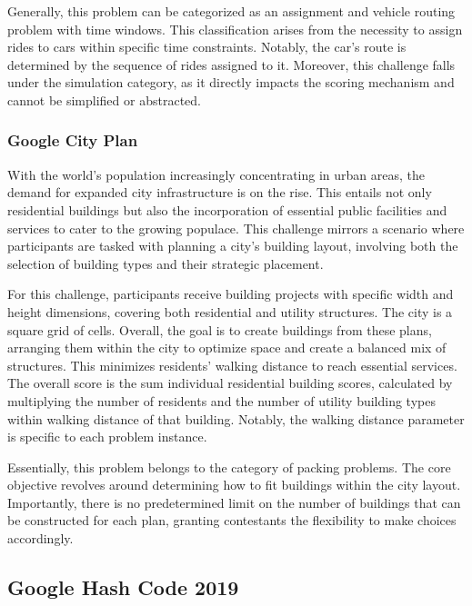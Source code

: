Generally, this problem can be categorized as an assignment and vehicle routing
problem with time windows. This classification arises from the necessity to
assign rides to cars within specific time constraints. Notably, the car's route
is determined by the sequence of rides assigned to it. Moreover, this challenge
falls under the simulation category, as it directly impacts the scoring
mechanism and cannot be simplified or abstracted.

\subsubsection*{Google City Plan}
\label{subsubsec:hashcode-2018-final}

With the world's population increasingly concentrating in urban areas, the
demand for expanded city infrastructure is on the rise. This entails not only
residential buildings but also the incorporation of essential public facilities
and services to cater to the growing populace. This challenge mirrors a scenario
where participants are tasked with planning a city's building layout,
involving both the selection of building types and their strategic placement.

For this challenge, participants receive building projects with specific width and
height dimensions, covering both residential and utility structures. The city is
a square grid of cells. Overall, the goal is to create buildings from these
plans, arranging them within the city to optimize space and create a balanced
mix of structures. This minimizes residents' walking distance to reach essential
services. The overall score is the sum individual residential building scores,
calculated by multiplying the number of residents and the number of utility
building types within walking distance of that building. Notably, the walking
distance parameter is specific to each problem instance.

Essentially, this problem belongs to the category of packing problems. The core
objective revolves around determining how to fit buildings within the city
layout. Importantly, there is no predetermined limit on the number of buildings
that can be constructed for each plan, granting contestants the flexibility to
make choices accordingly.

\subsection{Google Hash Code 2019}
\label{subsec:hashcode-2019}

